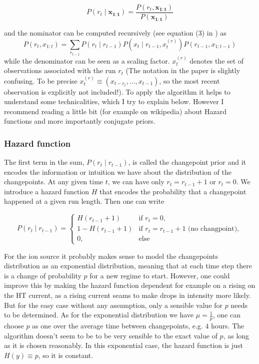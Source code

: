 \documentclass[12pt,a4paper]{article}
\begin{document}
\begin{equation*}
	P(r_t \mid \bm{{x_{1:t}}}) = \frac{P(r_t, \bm{{ x_{1:t}}})}{P(\bm{{x_{1:t}}})}
\end{equation*}

and the nominator can be computed recursively (see equation (3) in \cite{Adams:BayesianOnlineChangepoint}) as
\begin{equation}\label{eq:prob_rt_and_x1t}
	P(r_t, x_{1:t}) = \sum_{r_{t-1}} P(r_t \mid r_{t-1}) P(x_t \mid r_{t-1}, x_t^{(r)}) P(r_{t-1}, x_{1:t-1})
\end{equation}
while the denominator can be seen as a scaling factor. $x_t^{(r)}$ denotes the set of observations associated with the run $r_t$ (The notation in the paper is slightly confusing. To be precise $x_t^{(r)} \equiv (x_{t-r_t}, \dots, x_{t-1})$, so the most recent observation is explicitly not included!). To apply the algorithm it helps to understand some technicalities, which I try to explain below. However I recommend reading a little bit (for example on wikipedia) about Hazard functions and more importantly conjugate priors.

\subsubsection{Hazard function}
The first term in the sum, $P(r_t \mid r_{t-1})$,  is called the changepoint prior and it encodes the information or intuition we have about the distribution of the changepoints. At any given time $t$, we can have only $r_t=r_{t-1} + 1$ or $r_t=0$. We introduce a hazard function $H$ that encodes the probability that a changepoint happened at a given run length. Then one can write

\begin{equation*}
	P(r_t \mid r_{t-1}) = \begin{cases}
		H(r_{t-1} + 1) &\text{if } r_t=0, \\
		1 - H(r_{t-1} + 1) &\text{if } r_t=r_{t-1} + 1 \text{ (no changpoint)},  \\
		0, & \text{else} 
	\end{cases}
\end{equation*}

For the ion source it probably makes sense to model the changepoints distribution as an exponential distribution, meaning that at each time step there is a change of probability $p$ for a new regime to start. However, one could improve this by making the hazard function dependent for example on a rising on the HT current, as a rising current seams to make drops in intensity more likely. But for the easy case without any assumption, only a sensible value for $p$ needs to be determined. As for the exponential distribution we have $\mu=\frac1p$, one can choose $p$ as one over the average time between changepoints, e.g. $4$ hours. The algorithm doesn't seem to be to be very sensible to the exact value of $p$, as long as it is chosen reasonably. In this exponential case, the hazard function is just $H(y)\equiv p$, so it is constant.
\end{document}
